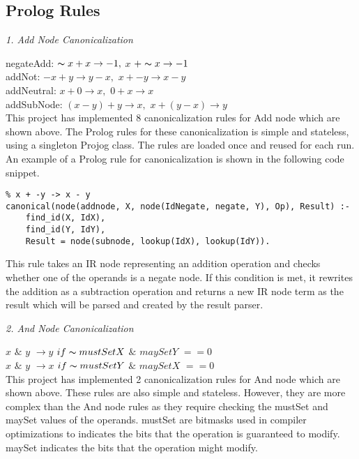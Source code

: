 \subsection{{Prolog Rules}}

\textit{1. Add Node Canonicalization}
\smallbreak

negateAdd: $\thicksim x + x \rightarrow -1,$ $x$ $+ \thicksim x \rightarrow -1$\\

addNot: $-x + y \rightarrow y - x,$ $ x + -y \rightarrow x - y$\\

addNeutral: $x + 0 \rightarrow x,$ $ 0 + x \rightarrow x$\\

addSubNode: $(x - y) + y \rightarrow x,$ $ x + (y - x) \rightarrow y$\\

This project has implemented 8 canonicalization rules for Add node which are shown above.
The Prolog rules for these canonicalization is simple and stateless, using a singleton Projog class. 
The rules are loaded once and reused for each run. 
An example of a Prolog rule for canonicalization is shown in the following code snippet. 

\begin{lstlisting}
% x + -y -> x - y
canonical(node(addnode, X, node(IdNegate, negate, Y), Op), Result) :-
    find_id(X, IdX),
    find_id(Y, IdY),
    Result = node(subnode, lookup(IdX), lookup(IdY)).
\end{lstlisting}
    
This rule takes an IR node representing an addition operation and checks whether one of the operands is a negate node. 
If this condition is met, it rewrites the addition as a subtraction operation and returns a new IR node term
as the result which will be parsed and created by the result parser.

\bigbreak
\textit{2. And Node Canonicalization}
\smallbreak

$x$ $\&$ $y$ $\rightarrow y$ $if \thicksim mustSetX$ $\&$ $maySetY$ $== 0$\\

$x$ $\&$ $y$ $\rightarrow x$ $if \thicksim mustSetY$ $\&$ $maySetX$ $== 0$\\

This project has implemented 2 canonicalization rules for And node which are shown above.
These rules are also simple and stateless.
However, they are more complex than the And node rules as they require checking the mustSet and maySet values of the operands.
mustSet are bitmasks used in compiler optimizations to indicates the bits that the operation is guaranteed to modify. maySet indicates the bits that the operation might modify.


